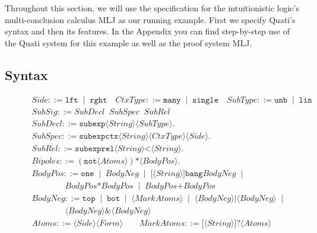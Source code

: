 \documentclass{llncs}
\newcommand{\tup}[1]{\langle#1\rangle}
\begin{document}
Throughout this section, we will use the specification for the
intuitionistic logic's multi-conclusion calculus MLJ \cite{maehara54nmj} as our running 
example. First we specify Quati's syntax and then its features. In the Appendix
you can find step-by-step use of the Quati system for this example as well as the proof system MLJ. 

\vspace{-2mm}

\subsection{Syntax}

\begin{figure}[t]
{\small
\[
\begin{array}{lcl}
Side ::= \texttt{lft} \;\;|\;\; \texttt{rght} \quad 
CtxType ::=  \texttt{many} \;\;|\;\; \texttt{single} \quad
SubType ::=  \texttt{unb} \;\;|\;\; \texttt{lin} \\[2pt]
SubSig ::= SubDecl \;\; SubSpec \;\; SubRel \\[2pt]
SubDecl ::= \texttt{subexp} \tup{String} \tup{SubType}.\\[2pt]
SubSpec ::= \texttt{subexpctx} \tup{String} \tup{CtxType} \tup{Side}.\\[2pt]
SubRel ::= \texttt{subexprel} \tup{String} \texttt{<} \tup{String}. \\[2pt]
Bipoles ::= (\texttt{not} \tup{Atoms}) \texttt{*} \tup{BodyPos}. \\[2pt]
BodyPos ::=\texttt{one} \;\;|\;\; BodyNeg \;\;|\;\; \texttt{[}\tup{String}\texttt{]bang} BodyNeg \;\;|\;\;\\ 
        \qquad\qquad BodyPos \texttt{*} BodyPos \;\;|\;\; BodyPos \texttt{+} BodyPos \\[2pt]
BodyNeg ::= \texttt{top} \;\;|\;\; \texttt{bot} \;\;|\;\; \tup{MarkAtoms} \;\;|\;\; \tup{BodyNeg}|\tup{BodyNeg} \;\;|\;\; \\
        \qquad \qquad \tup{BodyNeg} \texttt{\&} \tup{BodyNeg}\\[2pt]
Atoms ::=\tup{Side} \tup{Form} \qquad MarkAtoms ::=  \texttt{[}\tup{String}\texttt{]?} \tup{Atoms} \\
\end{array}
\]
}
\end{figure}
\end{document}
